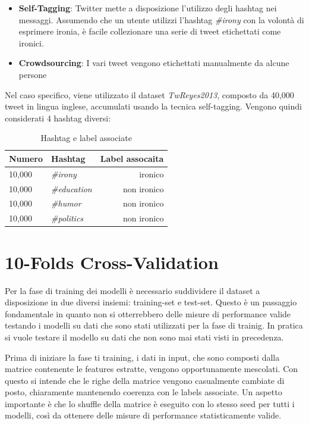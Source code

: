 \documentclass[oneside]{book}
\begin{document}
\begin{itemize}
	\item \textbf{Self-Tagging}:
	\label{chap:self-taggin}
	Twitter mette a disposizione l'utilizzo degli hashtag nei messaggi. Assumendo che un utente utilizzi l'hashtag \emph{\#irony} con la volontà di esprimere ironia, è facile collezionare una serie di tweet etichettati come ironici.
	
	\item \textbf{Crowdsourcing}:	
	I vari tweet vengono etichettati manualmente da alcune persone
\end{itemize}

Nel caso specifico, viene utilizzato il dataset \emph{TwReyes2013}, composto da 40,000 tweet in lingua inglese, accumulati usando la tecnica self-tagging. Vengono quindi considerati 4 hashtag diversi:


\begin{table}[ht]
	\centering
	\begin{tabular}[t]{llr}
		\hline
		\textbf{Numero} & \textbf{Hashtag}  & \textbf{Label assocaita}\\
		\hline
		10,000 & \emph{\#irony}     & ironico     \\
		10,000 & \emph{\#education} & non ironico \\
		10,000 & \emph{\#humor}     & non ironico \\
		10,000 & \emph{\#politics}  & non ironico \\
		\hline
	\end{tabular}
	\caption{Hashtag e label associate}
\end{table}%

\section{10-Folds Cross-Validation}
Per la fase di training dei modelli è necessario suddividere il dataset a disposizione in due diversi insiemi: training-set e test-set. Questo è un passaggio fondamentale in quanto non si otterrebbero delle misure di performance valide testando i modelli su dati che sono stati utilizzati per la fase di trainig. In pratica si vuole testare il modello su dati che non sono mai stati visti in precedenza.

Prima di iniziare la fase ti training, i dati in input, che sono composti dalla matrice contenente le features estratte, vengono opportunamente mescolati. Con questo si intende che le righe della matrice vengono casualmente cambiate di posto, chiaramente mantenendo coerenza con le labels associate. Un aspetto importante è che lo shuffle della matrice è eseguito con lo stesso seed per tutti i modelli, così da ottenere delle misure di performance statisticamente valide.
\end{document}
